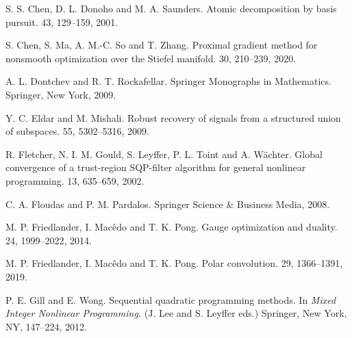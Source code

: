\documentclass[10pt]{article}
\numberwithin{equation}{section}
\begin{document}
\begin{thebibliography}{99}
S. S. Chen, D. L. Donoho and M. A. Saunders.
\newblock Atomic decomposition by basis pursuit.
 43, 129--159, 2001.


S. Chen, S. Ma, A. M.-C. So and T. Zhang.
\newblock Proximal gradient method for nonsmooth optimization over the Stiefel manifold.
 30, 210--239, 2020.


 A. L. Dontchev and R. T. Rockafellar.
\newblock Springer Monographs in Mathematics. Springer, New York, 2009.

Y. C. Eldar and M. Mishali.
\newblock Robust recovery of signals from a structured union of subspaces.
 55, 5302--5316, 2009.

R. Fletcher, N. I. M. Gould, S. Leyffer, P. L. Toint and A. W\"{a}chter.
\newblock Global convergence of a trust-region SQP-filter algorithm for general nonlinear programming.
 13, 635--659, 2002.

C. A. Floudas and P. M. Pardalos.
\newblock Springer Science \& Business Media, 2008.

M. P. Friedlander, I. Mac\^{e}do and T. K. Pong.
\newblock Gauge optimization and duality.
 24, 1999--2022, 2014.

M. P. Friedlander, I. Mac\^{e}do and T. K. Pong.
\newblock Polar convolution.
 29, 1366--1391, 2019.


P. E. Gill and E. Wong.
\newblock Sequential quadratic programming methods.
\newblock In {\em  Mixed Integer Nonlinear Programming.} (J. Lee and S. Leyffer eds.) Springer, New York, NY, 147--224, 2012.


\end{thebibliography}
\end{document}
